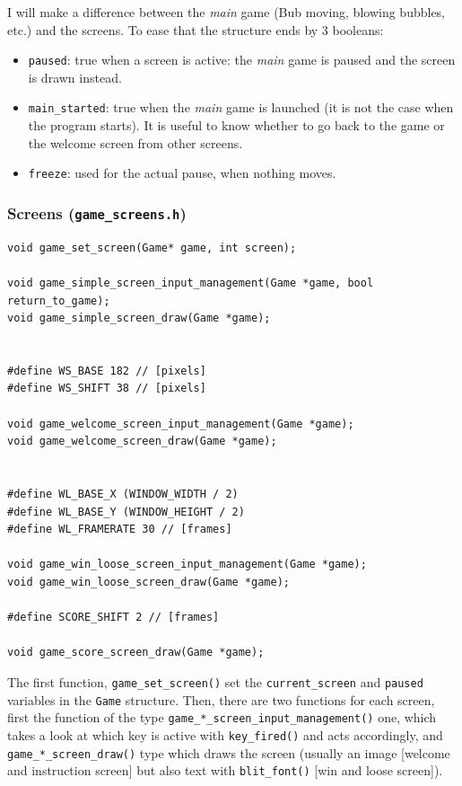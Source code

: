 \documentclass[12pt,a4paper]{article}
\newcommand{\cc}[1]{\texttt{#1}}
\begin{document}
I will make a difference between the \textit{main} game (Bub moving, blowing bubbles, etc.) and the screens. To ease that the structure ends by 3 booleans:\begin{itemize}
\item \cc{paused}: true when a screen is active: the \textit{main} game is paused and the screen is drawn instead.
\item \cc{main_started}: true when the \textit{main} game is launched (it is not the case when the program starts). It is useful to know whether to go back to the game or the welcome screen from other screens.
\item \cc{freeze}: used for the actual pause, when nothing moves.
\end{itemize}

\subsubsection{Screens (\texttt{game\_screens.h})}

\begin{verbatim}
void game_set_screen(Game* game, int screen);

void game_simple_screen_input_management(Game *game, bool return_to_game);
void game_simple_screen_draw(Game *game);


#define WS_BASE 182 // [pixels]
#define WS_SHIFT 38 // [pixels]

void game_welcome_screen_input_management(Game *game);
void game_welcome_screen_draw(Game *game);


#define WL_BASE_X (WINDOW_WIDTH / 2)
#define WL_BASE_Y (WINDOW_HEIGHT / 2)
#define WL_FRAMERATE 30 // [frames]

void game_win_loose_screen_input_management(Game *game);
void game_win_loose_screen_draw(Game *game);

#define SCORE_SHIFT 2 // [frames]

void game_score_screen_draw(Game *game);
\end{verbatim}

The first function, \cc{game_set_screen()} set the \cc{current_screen} and \cc{paused} variables in the \cc{Game} structure. Then, there are two functions for each screen, first the function of the type \cc{game_*_screen_input_management()} one, which takes a look at which key is active with \cc{key_fired()} and acts accordingly, and \cc{game_*_screen_draw()} type which draws the screen (usually an image [welcome and instruction screen] but also text with \cc{blit_font()} [win and loose screen]).
\end{document}
